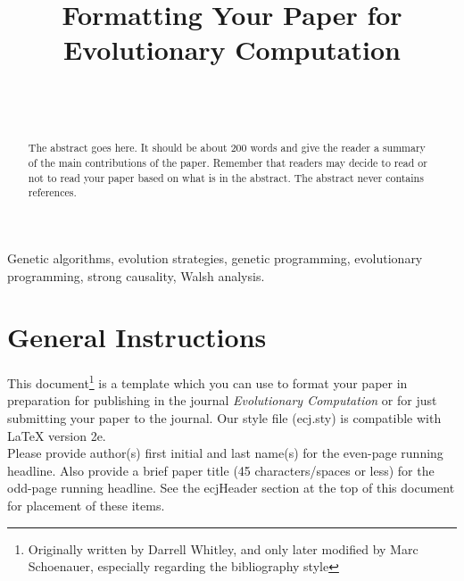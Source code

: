 \documentclass[twoside]{article}
\begin{document}
\title{\bf Formatting Your Paper for Evolutionary Computation}  

\author{ \hfill {}\\ 
\AND
        \hfill {}\\
}

\maketitle

\begin{abstract}

The abstract goes here.  It should be about 200 words and give the
reader a summary of the main contributions of the paper.   
Remember that readers may decide to read or not to read your
paper based on what is in the abstract.  The abstract never
contains references.  

\end{abstract}

\begin{keywords}

Genetic algorithms, 
evolution strategies,
genetic programming,
evolutionary programming,
strong causality,
Walsh analysis.

\end{keywords}

\section{General Instructions}

This document\footnote{Originally written by Darrell Whitley, and only later
  modified by Marc Schoenauer, especially regarding the bibliography style} 
is a template which you can use to format your paper in 
preparation for publishing in the journal {\em Evolutionary Computation} or 
for just submitting your paper to the journal. Our style file (ecj.sty) is 
compatible with LaTeX version 2e.\\   

Please provide author(s) first initial and last name(s) for the even-page 
running headline. Also provide a brief paper title (45 characters/spaces or 
less) for the odd-page running headline.  See the ecjHeader section at the 
top of this document for placement of these items.\\
\end{document}
